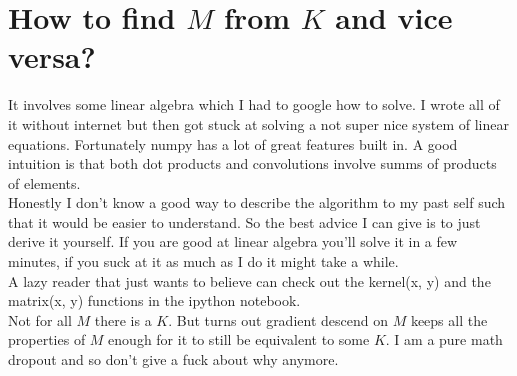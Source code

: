 \documentclass{article}
\begin{document}
\section*{\Large How to find $M$ from $K$ and vice versa?}
It involves some linear algebra which I had to google how to solve.
I wrote all of it without internet but then got stuck at solving a not super nice system of linear equations.
Fortunately numpy has a lot of great features built in.
A good intuition is that both dot products and convolutions involve summs of products of elements.
\\
Honestly I don't know a good way to describe the algorithm to my past self such that it would be easier to understand. So the best advice I can give is to just derive it yourself. 
If you are good at linear algebra you'll solve it in a few minutes, if you suck at it as much as I do it might take a while. \\ A lazy reader that just wants to believe can check out the {\selectfont kernel(x, y)} and the  {\selectfont matrix(x, y)}  functions in the ipython notebook. \\
Not for all $M$ there is a $K$. But turns out gradient descend on $M$ keeps all the properties of $M$ enough for it to still be equivalent to some $K$. I am a pure math dropout and so don't give a fuck about why anymore. 
\end{document}
